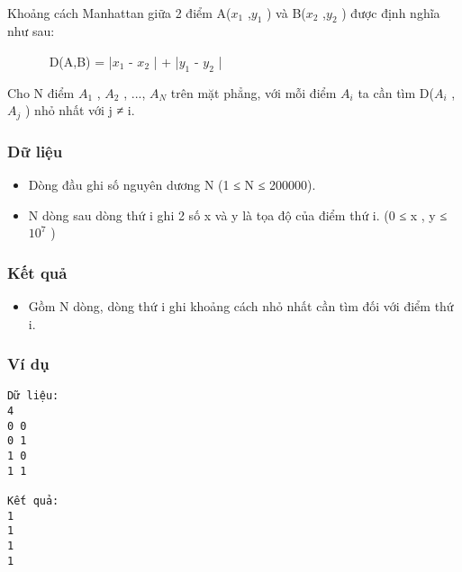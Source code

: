 

 

Khoảng cách Manhattan giữa 2 điểm A($x_{1}$ ,$y_{1}$ ) và B($x_{2}$ ,$y_{2}$ ) được định nghĩa như sau:

        D(A,B) = |$x_{1}$ - $x_{2}$ | + |$y_{1}$ - $y_{2}$ |

Cho N điểm $A_{1}$ , $A_{2}$ , ..., $A_{N}$ trên mặt phẳng, với mỗi điểm $A_{i}$ ta cần tìm D($A_{i}$ , $A_{j}$ ) nhỏ nhất với j ≠ i.

\subsubsection{Dữ liệu}
\begin{itemize}
	\item Dòng đầu ghi số nguyên dương N (1 ≤ N ≤ 200000).
	\item N dòng sau dòng thứ i ghi 2 số x và y là tọa độ của điểm thứ i. (0 ≤ x , y ≤ $10^{7}$ )
\end{itemize}

\subsubsection{Kết quả}
\begin{itemize}
	\item Gồm N dòng, dòng thứ i ghi khoảng cách nhỏ nhất cần tìm đối với điểm thứ i.
\end{itemize}

\subsubsection{Ví dụ}
\begin{verbatim}
Dữ liệu:
4
0 0
0 1
1 0
1 1

Kết quả:
1
1
1
1
\end{verbatim}
